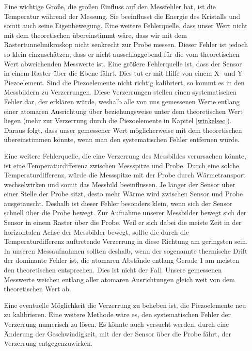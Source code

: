 \documentclass[10pt,a4paper]{article}
\begin{document}
Eine wichtige Größe, die großen Einfluss auf den Messfehler hat, ist die Temperatur während der Messung. Sie beeinflusst die Energie des Kristalls und somit auch seine Eigenbewegung. Eine weitere Fehlerquelle, dass unser Wert nicht mit dem theoretischen übereinstimmt wäre, dass wir mit dem Rastertunnelmikroskop nicht senkrecht zur Probe messen. Dieser Fehler ist jedoch so klein einzuschätzen, dass er nicht ausschlaggebend für die vom theoretischen Wert abweichenden Messwerte ist. Eine größere Fehlerquelle ist, dass der Sensor in einem Raster über die Ebene fährt. Dies tut er mit Hilfe von einem X- und Y-Piezoelement. Sind die Piezoelemente nicht richtig kalibriert, so kommt es in den Messbildern zu Verzerrungen. Diese Verzerrungen stellen einen systematischen Fehler dar, der erklären würde, weshalb alle von uns gemessenen Werte entlang einer atomaren Ausrichtung über beziehungsweise unter dem theoretischen Wert liegen (mehr zur Verzerrung durch die Piezoelemente in Kapitel \ref{winkelsec}). Daraus folgt, dass unser gemessener Wert möglicherweise mit dem theoretischen übereinstimmen könnte, wenn man den systematischen Fehler entfernen würde.  

Eine weitere Fehlerquelle, die eine Verzerrung des Messbildes verursachen könnte, ist eine Temperaturdifferenz zwischen Messspitze und Probe. Durch eine solche Temperaturdifferenz, würde die Messspitze mit der Probe durch Wärmetransport wechselwirken und somit das Messbild beeinflussen. Je länger der Sensor über einer Stelle der Probe sitzt, desto mehr Wärme wird zwischen Sensor und Probe ausgetauscht. Deshalb ist dieser Fehler besonders klein, wenn sich der Sensor schnell über die Probe bewegt. Zur Aufnahme unserer Messbilder bewegt sich der Sensor in einem Raster über die Probe. Weil er sich dabei die meiste Zeit in der horizontalen Achse der Messbilder bewegt, sollte die durch die Temperaturdifferenz auftretende Verzerrung in diese Richtung am geringsten sein. In unseren Messaufnahmen sollten deshalb, wenn der sogenannte thermische Drift der dominante Fehler ist, die atomaren Abstände entlang Gerade 1 am meisten den theoretischen entsprechen. Dies ist nicht der Fall. Unsere gemessenen Messwerte weichen entlang aller atomaren Ausrichtungen gleich weit von dem theoretischen Wert ab.

Eine eventuelle Möglichkeit die Verzerrung zu beheben ist, die Piezoelemente neu zu kalibrieren. Eine weitere Methode wäre es, den systematischen Fehler der Verzerrung numerisch zu lösen. Es könnte auch versucht werden, durch eine Änderung der Geschwindigkeit, mit der der Sensor über die Probe fährt, der Verzerrung entgegenzuwirken.
\end{document}

